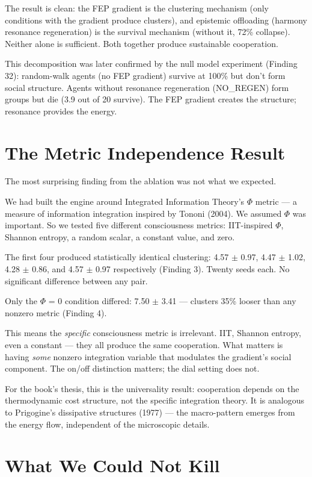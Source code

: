The result is clean: the FEP gradient is the clustering mechanism (only conditions with the gradient produce clusters), and epistemic offloading (harmony resonance regeneration) is the survival mechanism (without it, 72\% collapse). Neither alone is sufficient. Both together produce sustainable cooperation.

This decomposition was later confirmed by the null model experiment (Finding 32): random-walk agents (no FEP gradient) survive at 100\% but don't form social structure. Agents without resonance regeneration (NO\_REGEN) form groups but die (3.9 out of 20 survive). The FEP gradient creates the structure; resonance provides the energy.

\section{The Metric Independence Result}\label{the-metric-independence-result}

The most surprising finding from the ablation was not what we expected.

We had built the engine around Integrated Information Theory's $\Phi$ metric --- a measure of information integration inspired by Tononi (2004). We assumed $\Phi$ was important. So we tested five different consciousness metrics: IIT-inspired $\Phi$, Shannon entropy, a random scalar, a constant value, and zero.

The first four produced statistically identical clustering: 4.57 $\pm$ 0.97, 4.47 $\pm$ 1.02, 4.28 $\pm$ 0.86, and 4.57 $\pm$ 0.97 respectively (Finding 3). Twenty seeds each. No significant difference between any pair.

Only the $\Phi$ = 0 condition differed: 7.50 $\pm$ 3.41 --- clusters 35\% looser than any nonzero metric (Finding 4).

This means the \emph{specific} consciousness metric is irrelevant. IIT, Shannon entropy, even a constant --- they all produce the same cooperation. What matters is having \emph{some} nonzero integration variable that modulates the gradient's social component. The on/off distinction matters; the dial setting does not.

For the book's thesis, this is the universality result: cooperation depends on the thermodynamic cost structure, not the specific integration theory. It is analogous to Prigogine's dissipative structures (1977) --- the macro-pattern emerges from the energy flow, independent of the microscopic details.

\section{What We Could Not Kill}\label{what-we-could-not-kill}


